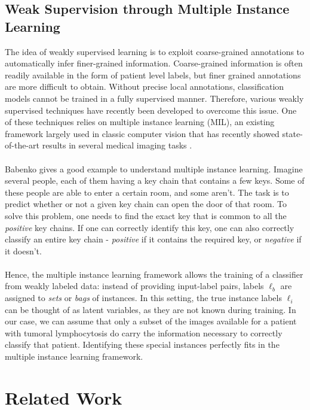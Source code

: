 \documentclass[final]{cvpr}
\begin{document}
	\subsection{Weak Supervision through Multiple Instance Learning} 
	
	The idea of weakly supervised learning is to exploit coarse-grained annotations to automatically infer finer-grained information. Coarse-grained information is often readily available in the form of patient level labels, but finer grained annotations are more difficult to obtain. Without precise local annotations, classification models cannot be trained in a fully supervised manner. Therefore, various weakly supervised techniques have recently been developed to overcome this issue. One of these techniques relies on multiple instance learning (MIL), an existing framework largely used in classic computer vision that has recently showed state-of-the-art results in several medical imaging tasks \cite{hou_MIL}. \\
	\\
	Babenko \cite{mil} gives a good example to understand multiple instance learning. Imagine several people, each of them having a key chain that contains a few keys. Some of these people are able to enter a certain room, and some aren’t. The task is to predict whether or not a given key chain can open the door of that room. To solve this problem, one needs to find the exact key that is common to all the \textit{positive} key chains. If one can correctly identify this key, one can also correctly classify an entire key chain - \textit{positive} if it contains the required key, or \textit{negative} if it doesn't.\\
	\\
	Hence, the multiple instance learning framework allows the training of a classifier from weakly labeled data: instead of providing input-label pairs, labels $\ell_b$ are assigned to \emph{sets} or \emph{bags} of instances. In this setting, the true instance labels $\ell_i$ can be thought of as latent variables, as they are not known during training. In our case, we can assume that only a subset of the images available for a patient with tumoral lymphocytosis do carry the information necessary to correctly classify that patient. Identifying these special instances perfectly fits in the multiple instance learning framework.
	
	\section{Related Work}
	
\end{document}
